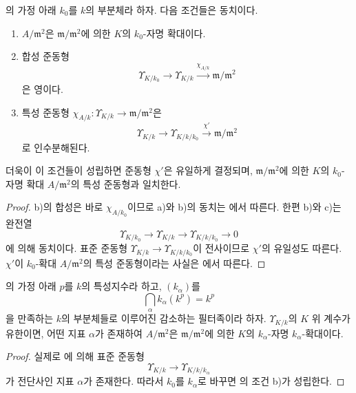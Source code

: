 \begin{corollary}[22.2.10]
\label{0.22.2.10-ko}
의 가정 아래 $k_0$를 $k$의 부분체라 하자. 다음
조건들은 동치이다.
\begin{enumerate}
  \item[a)] $A/\mathfrak m^2$은 $\mathfrak m/\mathfrak m^2$에 의한
  $K$의 $k_0$-자명 확대이다.
  \item[b)] 합성 준동형
  \[
    \Upsilon_{K/k_0}\longrightarrow\Upsilon_{K/k}
    \xrightarrow{\chi_{A/k}}\mathfrak m/\mathfrak m^2
  \]
  은 영이다.
  \item[c)] 특성 준동형
  $\chi_{A/k}:\Upsilon_{K/k}\to\mathfrak m/\mathfrak m^2$은
  \[
    \Upsilon_{K/k}\longrightarrow\Upsilon_{K/k/k_0}
    \xrightarrow{\chi'}\mathfrak m/\mathfrak m^2
  \]
  로 인수분해된다.
\end{enumerate}
더욱이 이 조건들이 성립하면 준동형 $\chi'$은 유일하게 결정되며,
$\mathfrak m/\mathfrak m^2$에 의한 $K$의 $k_0$-자명 확대
$A/\mathfrak m^2$의 특성 준동형과 일치한다.
\end{corollary}

\begin{proof}
b)의 합성은 바로 $\chi_{A/k_0}$이므로 a)와 b)의 동치는
에서 따른다. 한편 b)와 c)는 완전열
\[
  \Upsilon_{K/k_0}\longrightarrow\Upsilon_{K/k}
  \longrightarrow\Upsilon_{K/k/k_0}\longrightarrow0
\]
에 의해 동치이다. 표준 준동형
$\Upsilon_{K/k}\to\Upsilon_{K/k/k_0}$이 전사이므로 $\chi'$의 유일성도
따른다. $\chi'$이 $k_0$-확대 $A/\mathfrak m^2$의 특성 준동형이라는
사실은 에서 따른다.
\end{proof}

\begin{corollary}[22.2.11]
\label{0.22.2.11-ko}
의 가정 아래 $p$를 $k$의 특성지수라 하고,
$(k_\alpha)$를
\[
  \bigcap_\alpha k_\alpha(k^p)=k^p
\]
을 만족하는 $k$의 부분체들로 이루어진 감소하는 필터족이라 하자.
$\Upsilon_{K/k}$의 $K$ 위 계수가 유한이면, 어떤 지표 $\alpha$가 존재하여
$A/\mathfrak m^2$은 $\mathfrak m/\mathfrak m^2$에 의한 $K$의
$k_\alpha$-자명 $k_\alpha$-확대이다.
\end{corollary}

\begin{proof}
실제로 에 의해 표준 준동형
\[
  \Upsilon_{K/k}\longrightarrow\Upsilon_{K/k/k_\alpha}
\]
가 전단사인 지표 $\alpha$가 존재한다. 따라서 $k_0$를 $k_\alpha$로
바꾸면 의 조건 b)가 성립한다.
\end{proof}

